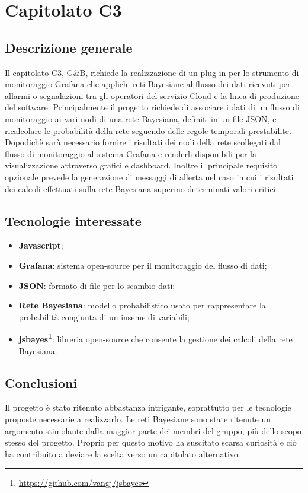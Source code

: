 \documentclass[11pt,a4paper]{article}
\begin{document}
		\section{Capitolato C3}
	\subsection{Descrizione generale}
Il capitolato C3, G\&B, richiede la realizzazione di un plug-in per lo strumento di monitoraggio Grafana che applichi reti Bayesiane al flusso dei dati ricevuti per allarmi o segnalazioni tra gli operatori del servizio Cloud e la linea di produzione del software.
Principalmente il progetto richiede di associare i dati di un flusso di monitoraggio ai vari nodi di una rete Bayesiana, definiti in un file JSON, e ricalcolare le probabilità della rete seguendo delle regole temporali prestabilite.
Dopodichè sarà necessario fornire i risultati dei nodi della rete scollegati dal flusso di monitoraggio al sistema Grafana e renderli disponibili per la visualizzazione attraverso grafici e dashboard.
Inoltre il principale requisito opzionale prevede la generazione di messaggi di allerta nel caso in cui i risultati dei calcoli effettuati sulla rete Bayesiana superino determinati valori critici.
\subsection{Tecnologie interessate}
\begin{itemize}
\item \textbf{Javascript};
\item \textbf{Grafana}: sistema open-source per il monitoraggio del flusso di dati;
\item \textbf{JSON}: formato di file per lo scambio dati;
\item \textbf{Rete Bayesiana}: modello probabilistico usato per rappresentare la probabilità congiunta di un inseme di variabili;
\item \textbf{jsbayes\footnote{\url{https://github.com/vangj/jsbayes}}}: libreria open-source che consente la gestione dei calcoli della rete Bayesiana.
\end{itemize}

\subsection{Conclusioni}
	Il progetto è stato ritenuto abbastanza intrigante, soprattutto per le tecnologie proposte necessarie a realizzarlo. Le reti Bayesiane sono state ritenute un argomento stimolante dalla maggior parte dei membri del gruppo, più dello scopo stesso del progetto. Proprio per questo motivo ha suscitato scarsa curiosità e
	ciò ha contribuito a deviare la scelta verso un capitolato alternativo.
	\newpage
\end{document}
